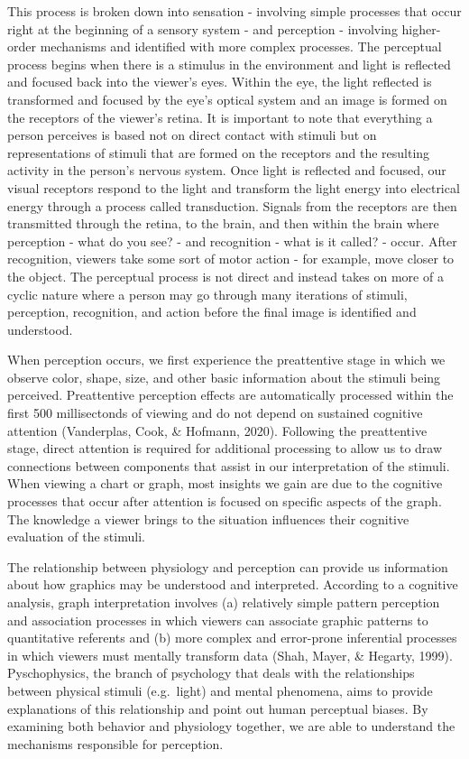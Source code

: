 \documentclass[print]{nuthesis}
\begin{document}
This process is broken down into sensation - involving simple processes that occur right at the beginning of a sensory system - and perception - involving higher-order mechanisms and identified with more complex processes.
The perceptual process begins when there is a stimulus in the environment and light is reflected and focused back into the viewer's eyes.
Within the eye, the light reflected is transformed and focused by the eye's optical system and an image is formed on the receptors of the viewer's retina.
It is important to note that everything a person perceives is based not on direct contact with stimuli but on representations of stimuli that are formed on the receptors and the resulting activity in the person's nervous system.
Once light is reflected and focused, our visual receptors respond to the light and transform the light energy into electrical energy through a process called transduction.
Signals from the receptors are then transmitted through the retina, to the brain, and then within the brain where perception - what do you see? - and recognition - what is it called? - occur.
After recognition, viewers take some sort of motor action - for example, move closer to the object.
The perceptual process is not direct and instead takes on more of a cyclic nature where a person may go through many iterations of stimuli, perception, recognition, and action before the final image is identified and understood.

When perception occurs, we first experience the preattentive stage in which we observe color, shape, size, and other basic information about the stimuli being perceived. Preattentive perception effects are automatically processed within the first 500 millisectonds of viewing and do not depend on sustained cognitive attention (Vanderplas, Cook, \& Hofmann, 2020).
Following the preattentive stage, direct attention is required for additional processing to allow us to draw connections between components that assist in our interpretation of the stimuli.
When viewing a chart or graph, most insights we gain are due to the cognitive processes that occur after attention is focused on specific aspects of the graph.
The knowledge a viewer brings to the situation influences their cognitive evaluation of the stimuli.

The relationship between physiology and perception can provide us information about how graphics may be understood and interpreted.
According to a cognitive analysis, graph interpretation involves (a) relatively simple pattern perception and association processes in which viewers can associate graphic patterns to quantitative referents and (b) more complex and error-prone inferential processes in which viewers must mentally transform data (Shah, Mayer, \& Hegarty, 1999).
Pyschophysics, the branch of psychology that deals with the relationships between physical stimuli (e.g.~light) and mental phenomena, aims to provide explanations of this relationship and point out human perceptual biases. By examining both behavior and physiology together, we are able to understand the mechanisms responsible for perception.
\end{document}

